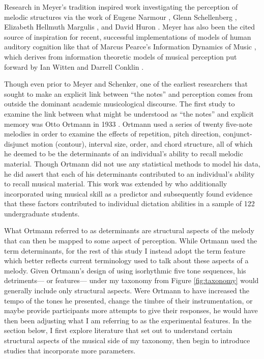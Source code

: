 \documentclass[12pt,]{book}
\begin{document}
Research in Meyer's tradition inspired work investigating the perception of melodic structures via the work of Eugene Narmour \citep{narmourAnalysisCognitionBasic1990, narmourAnalysisCognitionMelodic1992}, Glenn Schellenberg \citep{schellenbergSimplifyingImplicationRealizationModel1997}, Elizabeth Hellmuth Margulis \citep{margulisModelMelodicExpectation2005}, and David Huron \citep{huronSweetAnticipation2006}.
Meyer has also been the cited source of inspiration for recent, successful implementations of models of human auditory cognition like that of Marcus Pearce's Information Dynamics of Music \citep{pearceConstructionEvaluationStatistical2005, pearceStatisticalLearningProbabilistic2018a}, which derives from information theoretic models of musical perception put forward by Ian Witten and Darrell Conklin \citep{conklinMultipleViewpointSystems1995}.

Though even prior to Meyer and Schenker, one of the earliest researchers that sought to make an explicit link between ``the notes'' and perception comes from outside the dominant academic musicological discourse.
The first study to examine the link between what might be understood as ``the notes'' and explicit memory was Otto Ortmann in 1933 \citep{ortmannTonalDeterminantsMelodic1933}.
Ortmann used a series of twenty five-note melodies in order to examine the effects of repetition, pitch direction, conjunct-disjunct motion (contour), interval size, order, and chord structure, all of which he deemed to be the determinants of an individual's ability to recall melodic material.
Though Ortmann did not use any statistical methods to model his data, he did assert that each of his determinants contributed to an individual's ability to recall musical material.
This work was extended by \citet{taylorStrategiesMemoryShort1983} who additionally incorporated using musical skill as a predictor and subsequently found evidence that these factors contributed to individual dictation abilities in a sample of 122 undergraduate students.

What Ortmann referred to as determinants are structural aspects of the melody that can then be mapped to some aspect of perception.
While Ortmann used the term determinants, for the rest of this study I instead adopt the term feature which better reflects current terminology used to talk about these aspects of a melody.
Given Ortmann's design of using isorhythmic five tone sequences, his detriments--- or features--- under my taxonomy from Figure \ref{fig:taxonomy} would generally include only structural aspects.
Were Ortmann to have increased the tempo of the tones he presented, change the timbre of their instrumentation, or maybe provide participants more attempts to give their responses, he would have then been adjusting what I am referring to as the experimental features.
In the section below, I first explore literature that set out to understand certain structural aspects of the musical side of my taxonomy, then begin to introduce studies that incorporate more parameters.
\end{document}
